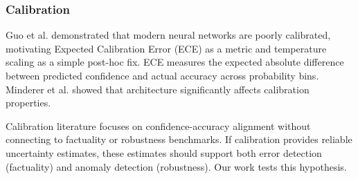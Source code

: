\subsubsection{Calibration}

Guo et al. demonstrated that modern neural networks are poorly calibrated, motivating Expected Calibration Error (ECE) as a metric and temperature scaling as a simple post-hoc fix. ECE measures the expected absolute difference between predicted confidence and actual accuracy across probability bins. Minderer et al. showed that architecture significantly affects calibration properties.

Calibration literature focuses on confidence-accuracy alignment without connecting to factuality or robustness benchmarks. If calibration provides reliable uncertainty estimates, these estimates should support both error detection (factuality) and anomaly detection (robustness). Our work tests this hypothesis.

\begin{table}[htbp]
\centering
{}
\end{table}

